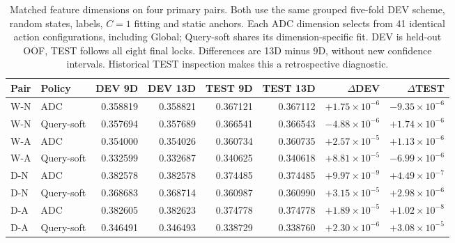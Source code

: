 \begin{table}[htbp]
\centering\footnotesize
\setlength{\tabcolsep}{4pt}
\caption{Matched feature dimensions on four primary pairs. Both use the same grouped five-fold DEV scheme, random states, labels, $C=1$ fitting and static anchors. Each ADC dimension selects from 41 identical action configurations, including Global; Query-soft shares its dimension-specific fit. DEV is held-out OOF, TEST follows all eight final locks. Differences are 13D minus 9D, without new confidence intervals. Historical TEST inspection makes this a retrospective diagnostic.}
\label{tab:dimension-mrr}
\begin{tabular}{llrrrrrr}
\toprule
Pair & Policy & DEV 9D & DEV 13D & TEST 9D & TEST 13D & $\Delta$DEV & $\Delta$TEST\\
\midrule
W-N & ADC & 0.358819 & 0.358821 & 0.367121 & 0.367112 & $+1.75\times10^{-6}$ & $-9.35\times10^{-6}$\\
W-N & Query-soft & 0.357694 & 0.357689 & 0.366541 & 0.366543 & $-4.88\times10^{-6}$ & $+1.74\times10^{-6}$\\
W-A & ADC & 0.354000 & 0.354026 & 0.360734 & 0.360735 & $+2.57\times10^{-5}$ & $+1.13\times10^{-6}$\\
W-A & Query-soft & 0.332599 & 0.332687 & 0.340625 & 0.340618 & $+8.81\times10^{-5}$ & $-6.99\times10^{-6}$\\
D-N & ADC & 0.382578 & 0.382578 & 0.374485 & 0.374485 & $+9.97\times10^{-9}$ & $+4.49\times10^{-7}$\\
D-N & Query-soft & 0.368683 & 0.368714 & 0.360987 & 0.360990 & $+3.15\times10^{-5}$ & $+2.98\times10^{-6}$\\
D-A & ADC & 0.382605 & 0.382623 & 0.374778 & 0.374778 & $+1.89\times10^{-5}$ & $+1.02\times10^{-8}$\\
D-A & Query-soft & 0.346491 & 0.346493 & 0.338729 & 0.338760 & $+2.30\times10^{-6}$ & $+3.08\times10^{-5}$\\
\bottomrule
\end{tabular}
\end{table}
